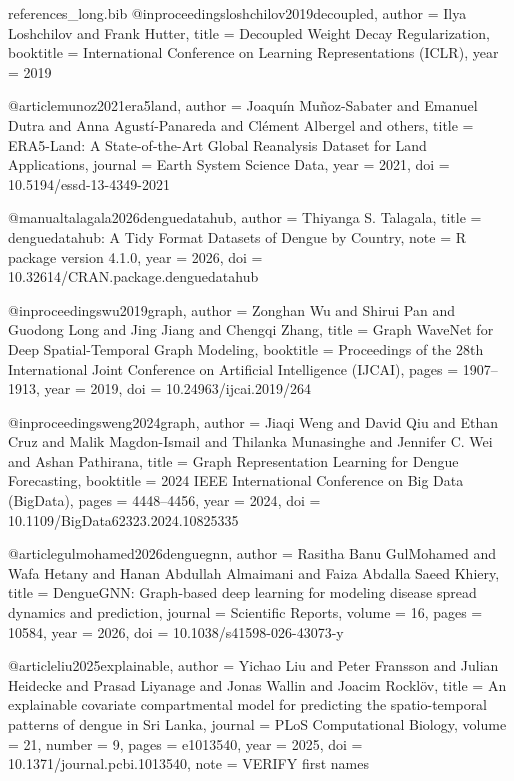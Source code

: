 \begin{filecontents*}[overwrite]{references_long.bib}
@inproceedings{loshchilov2019decoupled,
  author    = {Ilya Loshchilov and Frank Hutter},
  title     = {Decoupled Weight Decay Regularization},
  booktitle = {International Conference on Learning Representations (ICLR)},
  year      = {2019}
}

@article{munoz2021era5land,
  author  = {Joaqu{\'i}n Mu{\~n}oz-Sabater and Emanuel Dutra and Anna Agust{\'i}-Panareda and Cl{\'e}ment Albergel and others},
  title   = {{ERA5-Land}: A State-of-the-Art Global Reanalysis Dataset for Land Applications},
  journal = {Earth System Science Data},
  year    = {2021},
  doi     = {10.5194/essd-13-4349-2021}
}

@manual{talagala2026denguedatahub,
  author = {Thiyanga S. Talagala},
  title  = {denguedatahub: A Tidy Format Datasets of Dengue by Country},
  note   = {R package version 4.1.0},
  year   = {2026},
  doi    = {10.32614/CRAN.package.denguedatahub}
}

@inproceedings{wu2019graph,
  author    = {Zonghan Wu and Shirui Pan and Guodong Long and Jing Jiang and Chengqi Zhang},
  title     = {Graph {WaveNet} for Deep Spatial-Temporal Graph Modeling},
  booktitle = {Proceedings of the 28th International Joint Conference on Artificial Intelligence (IJCAI)},
  pages     = {1907--1913},
  year      = {2019},
  doi       = {10.24963/ijcai.2019/264}
}


@inproceedings{weng2024graph,
  author    = {Jiaqi Weng and David Qiu and Ethan Cruz and Malik Magdon-Ismail and Thilanka Munasinghe and Jennifer C. Wei and Ashan Pathirana},
  title     = {Graph Representation Learning for Dengue Forecasting},
  booktitle = {2024 IEEE International Conference on Big Data (BigData)},
  pages     = {4448--4456},
  year      = {2024},
  doi       = {10.1109/BigData62323.2024.10825335}
}

@article{gulmohamed2026denguegnn,
  author  = {Rasitha Banu GulMohamed and Wafa Hetany and Hanan Abdullah Almaimani and Faiza Abdalla Saeed Khiery},
  title   = {{DengueGNN}: Graph-based deep learning for modeling disease spread dynamics and prediction},
  journal = {Scientific Reports},
  volume  = {16},
  pages   = {10584},
  year    = {2026},
  doi     = {10.1038/s41598-026-43073-y}
}

@article{liu2025explainable,
  author  = {Yichao Liu and Peter Fransson and Julian Heidecke and Prasad Liyanage and Jonas Wallin and Joacim Rockl{\"o}v},
  title   = {An explainable covariate compartmental model for predicting the spatio-temporal patterns of dengue in {Sri Lanka}},
  journal = {PLoS Computational Biology},
  volume  = {21},
  number  = {9},
  pages   = {e1013540},
  year    = {2025},
  doi     = {10.1371/journal.pcbi.1013540},
  note    = {VERIFY first names}
}


\end{filecontents*}
